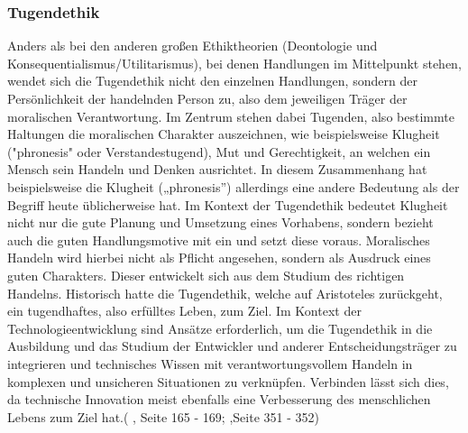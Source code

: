 \subsubsection{Tugendethik}
Anders als bei den anderen großen Ethiktheorien (Deontologie und Konsequentialismus/Utilitarismus), bei denen Handlungen im Mittelpunkt stehen, wendet sich die Tugendethik nicht den einzelnen Handlungen, sondern der Persönlichkeit der handelnden Person zu, also dem jeweiligen Träger der moralischen Verantwortung. Im Zentrum stehen dabei Tugenden, also bestimmte Haltungen die moralischen Charakter auszeichnen, wie beispielsweise Klugheit ("phronesis" oder Verstandestugend), Mut und Gerechtigkeit, an welchen ein Mensch sein Handeln und Denken ausrichtet. In diesem Zusammenhang hat beispielsweise die Klugheit („phronesis”) allerdings eine andere Bedeutung als der Begriff heute üblicherweise hat. Im Kontext der Tugendethik bedeutet Klugheit nicht nur die gute Planung und Umsetzung eines Vorhabens, sondern bezieht auch die guten Handlungsmotive mit ein und setzt diese voraus. Moralisches Handeln wird hierbei nicht als Pflicht angesehen, sondern als Ausdruck eines guten Charakters. Dieser entwickelt sich aus dem Studium des richtigen Handelns. Historisch hatte die Tugendethik, welche auf Aristoteles zurückgeht, ein tugendhaftes, also erfülltes Leben, zum Ziel. Im Kontext der Technologieentwicklung sind Ansätze erforderlich, um die Tugendethik in die Ausbildung und das Studium der Entwickler und anderer Entscheidungsträger zu integrieren und technisches Wissen mit verantwortungsvollem Handeln in komplexen und unsicheren Situationen zu verknüpfen. Verbinden lässt sich dies, da technische Innovation meist ebenfalls eine Verbesserung des menschlichen Lebens zum Ziel hat.( \cite{grunwaldHandbuchTechnikethik2021}, Seite 165 - 169; \cite{corcilius_phronesis_2021},Seite 351 - 352)


